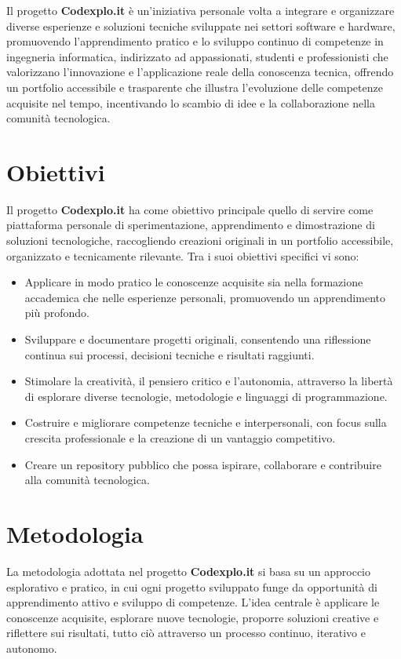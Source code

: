 \documentclass[10pt, a4paper, oneside]{article}
\begin{document}
Il progetto \textbf{Codexplo.it} è un’iniziativa personale volta a integrare e organizzare diverse esperienze e soluzioni tecniche sviluppate nei settori software e hardware, promuovendo l’apprendimento pratico e lo sviluppo continuo di competenze in ingegneria informatica, indirizzato ad appassionati, studenti e professionisti che valorizzano l’innovazione e l’applicazione reale della conoscenza tecnica, offrendo un portfolio accessibile e trasparente che illustra l’evoluzione delle competenze acquisite nel tempo, incentivando lo scambio di idee e la collaborazione nella comunità tecnologica.

\section{Obiettivi}

Il progetto \textbf{Codexplo.it} ha come obiettivo principale quello di servire come piattaforma personale di sperimentazione, apprendimento e dimostrazione di soluzioni tecnologiche, raccogliendo creazioni originali in un portfolio accessibile, organizzato e tecnicamente rilevante. Tra i suoi obiettivi specifici vi sono:

\begin{itemize}
  \item Applicare in modo pratico le conoscenze acquisite sia nella formazione accademica che nelle esperienze personali, promuovendo un apprendimento più profondo.
  \item Sviluppare e documentare progetti originali, consentendo una riflessione continua sui processi, decisioni tecniche e risultati raggiunti.
  \item Stimolare la creatività, il pensiero critico e l’autonomia, attraverso la libertà di esplorare diverse tecnologie, metodologie e linguaggi di programmazione.
  \item Costruire e migliorare competenze tecniche e interpersonali, con focus sulla crescita professionale e la creazione di un vantaggio competitivo.
  \item Creare un repository pubblico che possa ispirare, collaborare e contribuire alla comunità tecnologica.\newpage
\end{itemize}

\section{Metodologia}

La metodologia adottata nel progetto \textbf{Codexplo.it} si basa su un approccio esplorativo e pratico, in cui ogni progetto sviluppato funge da opportunità di apprendimento attivo e sviluppo di competenze. L’idea centrale è applicare le conoscenze acquisite, esplorare nuove tecnologie, proporre soluzioni creative e riflettere sui risultati, tutto ciò attraverso un processo continuo, iterativo e autonomo.
\end{document}
